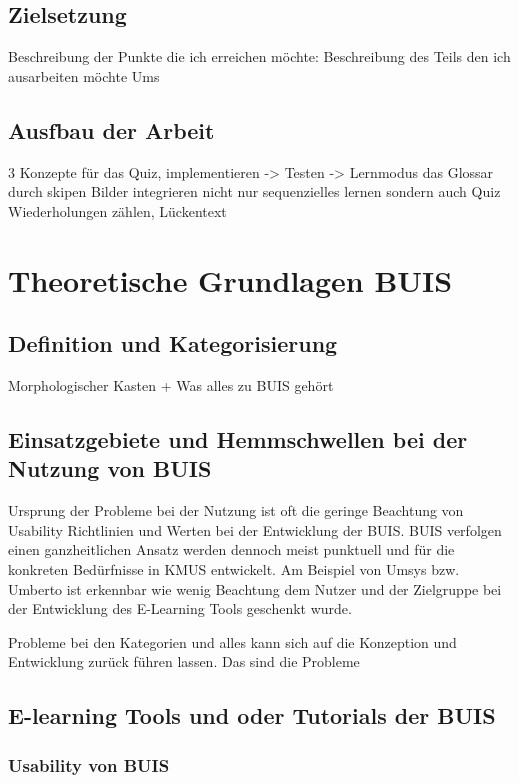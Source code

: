 \documentclass[a4paper, 12pt, twoside, BCOR=20mm, DIV=calc, abstracton, parskip=half*, toc=bibliography, toc=listof, headsepline, headings=small, numbers=enddot]{scrreprt} %
\begin{document}
\section{}
\section{Zielsetzung}
Beschreibung der Punkte die ich erreichen möchte:
Beschreibung des Teils den ich ausarbeiten möchte
Ums

\section{Ausfbau der Arbeit}
3 Konzepte für das Quiz, implementieren -> Testen ->
Lernmodus das Glossar durch skipen Bilder integrieren 
nicht nur sequenzielles lernen sondern auch  
Quiz  Wiederholungen zählen, 
Lückentext 


\chapter{Theoretische Grundlagen BUIS}
\section{Definition und Kategorisierung}
Morphologischer Kasten + Was alles zu BUIS gehört
\section{Einsatzgebiete und Hemmschwellen bei der Nutzung von BUIS}
Ursprung der Probleme bei der Nutzung ist oft die geringe Beachtung von Usability Richtlinien und Werten bei der Entwicklung der BUIS. 
BUIS verfolgen einen ganzheitlichen Ansatz werden dennoch meist punktuell und für die konkreten Bedürfnisse in KMUS entwickelt. 
Am Beispiel von Umsys bzw. Umberto ist erkennbar wie wenig Beachtung dem Nutzer und der Zielgruppe bei der Entwicklung des E-Learning Tools geschenkt wurde. 

Probleme bei den Kategorien und alles kann sich auf die Konzeption und Entwicklung zurück führen lassen.
Das sind die Probleme
\section{E-learning Tools und oder Tutorials der BUIS}
\subsection{Usability von BUIS}
\end{document}
